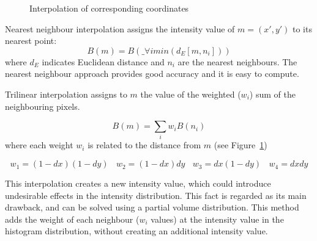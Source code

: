 \begin{figure}[htb]
        \centering
        \epsfxsize=4cm
        {}
  \caption{Interpolation of corresponding coordinates}
  \label{fig:interp}
\end{figure}

Nearest neighbour interpolation assigns the intensity value of
$m=(x',y')$ to its nearest point:
\begin{equation}
        B(m)=B(\_{\forall i}{min}(d_E[m,n_i]))
\end{equation}
\noindent where $d_E$ indicates Euclidean distance and $n_i$ are
the nearest neighbours. The nearest neighbour approach provides
good accuracy and it is easy to compute.

Trilinear interpolation assigns to $m$ the value of the weighted
($w_i$) sum of the neighbouring pixels.

\begin{equation}
        B(m)=\sum_iw_i B(n_i)
\end{equation}
\noindent where each weight $w_i$ is related to the distance from
$m$ (see Figure~\ref{fig:interp})

\begin{equation}
        w_1 = (1-dx)(1-dy) ~~~~ w_2 = (1-dx)dy ~~~~w_3 = dx(1-dy)
        ~~~~ w_4 = dx dy
        \nonumber
\end{equation}

This interpolation creates a new intensity value, which could
introduce undesirable effects in the intensity distribution. This
fact is regarded as its main drawback, and can be solved using a
partial volume distribution. This method adds the weight of each
neighbour ($w_i$ values) at the intensity value in the histogram
distribution, without creating an additional intensity value.
